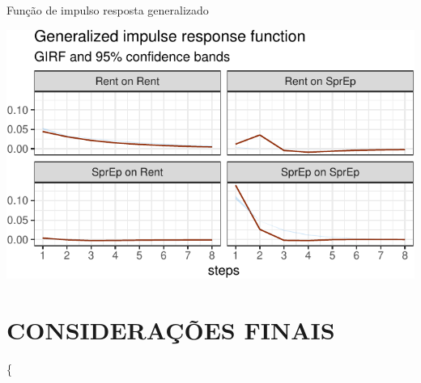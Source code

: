 \documentclass[
  12pt,
  12pt,
  openright,
  oneside,
  a4paper,
  chapter=TITLE,
  section=TITLE,
  subsection=TITLE,
  subsubsection=TITLE,
  english,
  portugues,
  sumario=tradicional]{abntex2}
\begin{document}
\begin{grafico}[!htbp]
\caption{Função de impulso resposta generalizado}
\vspace{-4mm}

\begin{center}\includegraphics{12-exportedfigures/impulse.plot.genera-1} \end{center}
\vspace{-3mm}
\label{graf:impulsegen}
\vspace{-2mm}
\end{grafico}


\chapter*[Conclusão]{CONSIDERAÇÕES FINAIS}

\postextual

\postextual



\{
\end{document}
